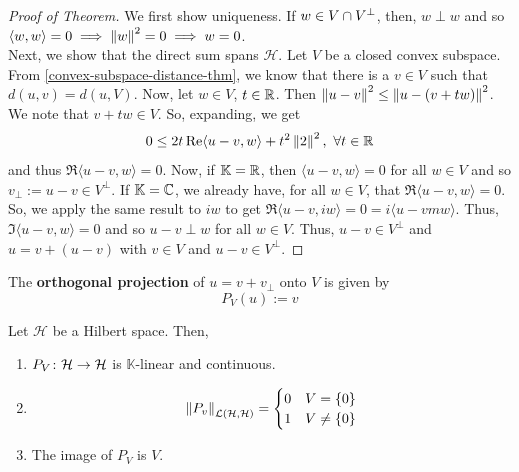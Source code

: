 \documentclass[11pt,leqno,oneside]{amsbook}
\numberwithin{thm}{section}
\newcommand{\cL}{\mathcal{L}}
\newcommand{\K}{\mathbb{K}} %
\renewcommand{\H}{\mathcal{H}} %
\renewcommand{\de}{\textbf} %
\begin{document}
\begin{proof}[Proof of Theorem]
  We first show uniqueness. If \(w \in V \intersect V^\perp\), then,
  \(w \perp w\) and so \(\langle w,w \rangle = 0 \implies \norm[w]^2 =
  0 \implies w = 0\). \\

  Next, we show that the direct sum spans \(\H\). Let \(V\) be a
  closed convex subspace. From \ref{convex-subspace-distance-thm}, we
  know that there is a \(v \in V\) such that \(d(u,v) = d(u,V)\). Now,
  let \(w \in V\), \(t \in \R\). Then \(\norm[u-v]^2 \leq
  \norm[u-(v+tw)]^2\). We note that \(v+tw \in V\). So, expanding, we
  get \[
    0 \leq 2t \Re \langle u-v,w \rangle + t^2 \norm[2]^2,\ \forall t
    \in \R
  \]
  and thus \(\Re \langle u-v,w \rangle = 0\). Now, if \(\K = \R\),
  then \(\langle u-v,w \rangle = 0\) for all \(w \in V\) and so
  \(v_\perp := u-v \in V^\perp\). If \(\K = \C\), we already have, for
  all \(w \in V\), that \(\Re \langle u-v,w \rangle = 0\). So, we
  apply the same result to \(iw\) to get \(\Re \langle u-v,iw \rangle
  = 0 = i \langle u-vmw \rangle\). Thus, \(\Im \langle u-v,w \rangle =
  0\) and so \(u-v \perp w\) for all \(w \in V\). Thus, \(u-v \in
  V^\perp\) and \(u = v + (u-v)\) with \(v \in V\) and \(u-v \in
  V^\perp\).
\end{proof}
\begin{defn}
  The \de{orthogonal projection} of \(u = v + v_\perp\) onto \(V\) is given by \[
    P_V(u) := v
  \]
\end{defn}
\begin{prop}
  Let \(\H\) be a Hilbert space. Then,
  \begin{enumerate}
  \item \(P_V \from \H \to \H\) is \(\K\)-linear and continuous.
  \item \[
      \norm[P_v]_{\cL(\H,\H)} =
      \begin{cases}
        0 & V = \{0\} \\
        1 & V \neq \{0\}
      \end{cases}
    \]
  \item The image of \(P_V\) is \(V\).
  \end{enumerate}
\end{prop}
\end{document}
